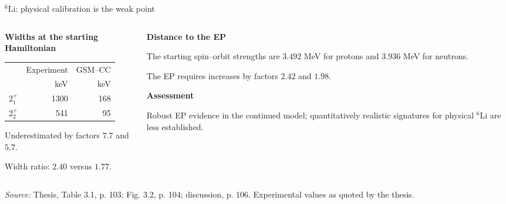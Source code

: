 \documentclass[aspectratio=169,11pt]{beamer}
\newcommand{\nuc}[2]{\ensuremath{{}^{#1}\mathrm{#2}}}
\newcommand{\src}[1]{\par\vfill{\color{muted}\fontsize{7.5}{9}\selectfont\textit{Source:} #1\par}}
\newcommand{\spacer}{\vspace{2mm}}
\begin{document}
\begin{frame}{\nuc{6}{Li}: physical calibration is the weak point}
\begin{columns}[T]
\begin{column}{.46\textwidth}
\textbf{Widths at the starting Hamiltonian}
\medskip
\small\renewcommand{\arraystretch}{1.4}
\begin{tabular}{lrr}
\toprule
 & Experiment & GSM--CC\\
 & keV & keV\\\midrule
$2^+_1$ & 1300 & 168\\
$2^+_2$ & 541 & 95\\\bottomrule
\end{tabular}
\medskip
\par Underestimated by factors $7.7$ and $5.7$.
\par Width ratio: $2.40$ versus $1.77$.
\end{column}
\begin{column}{.50\textwidth}
\textbf{Distance to the EP}
\spacer
\par The starting spin--orbit strengths are $3.492$ MeV for protons and $3.936$ MeV for neutrons.
\medskip
\par The EP requires increases by factors $2.42$ and $1.98$.
\medskip
\par\textbf{Assessment}
\spacer
\par Robust EP evidence in the continued model; quantitatively realistic signatures for physical \nuc{6}{Li} are less established.
\end{column}
\end{columns}
\src{Thesis, Table 3.1, p. 103; Fig. 3.2, p. 104; discussion, p. 106. Experimental values as quoted by the thesis.}
\end{frame}
\end{document}
